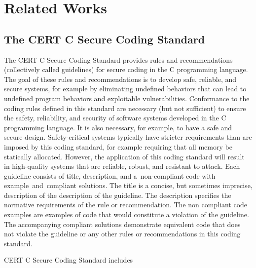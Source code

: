 \chapter{Related Works}

\section{The CERT C Secure Coding Standard }
The CERT C Secure Coding Standard \cite{cert-c} provides rules and recommendations (collectively called guidelines) for secure coding in the C programming language. The goal of these rules and recommendations is to develop safe, reliable, and secure systems, for example by eliminating undefined behaviors that can lead to undefined program behaviors and exploitable vulnerabilities. Conformance to the coding rules defined in this standard are necessary (but not sufficient) to ensure the safety, reliability, and security of software systems developed in the C programming language. It is also necessary, for example, to have a safe and secure design. Safety-critical systems typically have stricter requirements than are imposed by this coding standard, for example requiring that all memory be statically allocated. However, the application of this coding standard will result in high-quality systems that are reliable, robust, and resistant to attack.
Each guideline consists of title, description, and a non-compliant code with example and compliant solutions. The title is a concise, but sometimes imprecise, description of the description of the guideline. The description specifies the normative requirements of the rule or recommendation. The non compliant code examples are examples of code that would constitute a violation of the guideline. The accompanying compliant solutions demonstrate equivalent code that does not violate the guideline or any other rules or recommendations in this coding standard.

CERT C Secure Coding Standard includes

